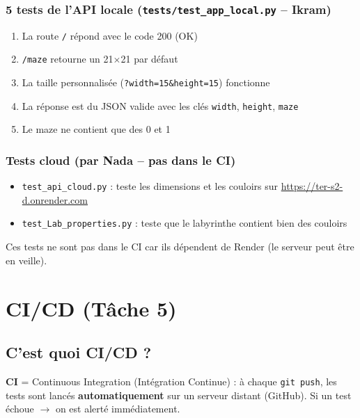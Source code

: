 \documentclass[12pt,a4paper]{article}
\begin{document}
\subsubsection{5 tests de l'API locale (\texttt{tests/test\_app\_local.py} -- Ikram)}

\begin{enumerate}
    \item La route \texttt{/} répond avec le code 200 (OK)
    \item \texttt{/maze} retourne un 21$\times$21 par défaut
    \item La taille personnalisée (\texttt{?width=15\&height=15}) fonctionne
    \item La réponse est du JSON valide avec les clés \texttt{width}, \texttt{height}, \texttt{maze}
    \item Le maze ne contient que des 0 et 1
\end{enumerate}

\subsubsection{Tests cloud (par Nada -- pas dans le CI)}

\begin{itemize}
    \item \texttt{test\_api\_cloud.py} : teste les dimensions et les couloirs sur \url{https://ter-s2-d.onrender.com}
    \item \texttt{test\_Lab\_properties.py} : teste que le labyrinthe contient bien des couloirs
\end{itemize}

Ces tests ne sont pas dans le CI car ils dépendent de Render (le serveur peut être en veille).

\section{CI/CD (Tâche 5)}

\subsection{C'est quoi CI/CD ?}

\begin{definitionbox}
\textbf{CI} = Continuous Integration (Intégration Continue) : à chaque \texttt{git push}, les tests sont lancés \textbf{automatiquement} sur un serveur distant (GitHub). Si un test échoue $\rightarrow$ on est alerté immédiatement.
\end{definitionbox}
\end{document}
